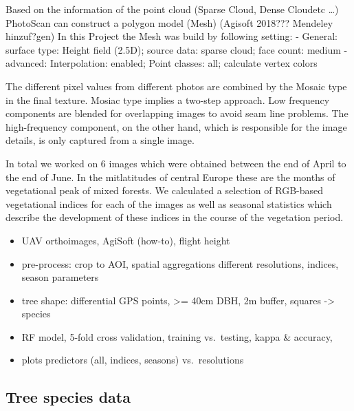 \documentclass[]{article}
\providecommand{\tightlist}{%
  \setlength{\itemsep}{0pt}\setlength{\parskip}{0pt}}
\begin{document}
Based on the information of the point cloud (Sparse Cloud, Dense
Cloudetc \ldots{}) PhotoScan can construct a polygon model (Mesh)
(Agisoft 2018??? Mendeley hinzuf?gen) In this Project the Mesh was build
by following setting: - General: surface type: Height field (2.5D);
source data: sparse cloud; face count: medium - advanced: Interpolation:
enabled; Point classes: all; calculate vertex colors

The different pixel values from different photos are combined by the
Mosaic type in the final texture. Mosiac type implies a two-step
approach. Low frequency components are blended for overlapping images to
avoid seam line problems. The high-frequency component, on the other
hand, which is responsible for the image details, is only captured from
a single image.

In total we worked on 6 images which were obtained between the end of
April to the end of June. In the mitlatitudes of central Europe these
are the months of vegetational peak of mixed forests. We calculated a
selection of RGB-based vegetational indices for each of the images as
well as seasonal statistics which describe the development of these
indices in the course of the vegetation period.

\begin{itemize}
\tightlist
\item
  UAV orthoimages, AgiSoft (how-to), flight height
\item
  pre-process: crop to AOI, spatial aggregations different resolutions,
  indices, season parameters
\item
  tree shape: differential GPS points, \textgreater{}= 40cm DBH, 2m
  buffer, squares -\textgreater{} species
\item
  RF model, 5-fold cross validation, training vs.~testing, kappa \&
  accuracy,
\item
  plots predictors (all, indices, seasons) vs.~resolutions
\end{itemize}

\hypertarget{tree-species-data}{%
\subsection{Tree species data}\label{tree-species-data}}
\end{document}
